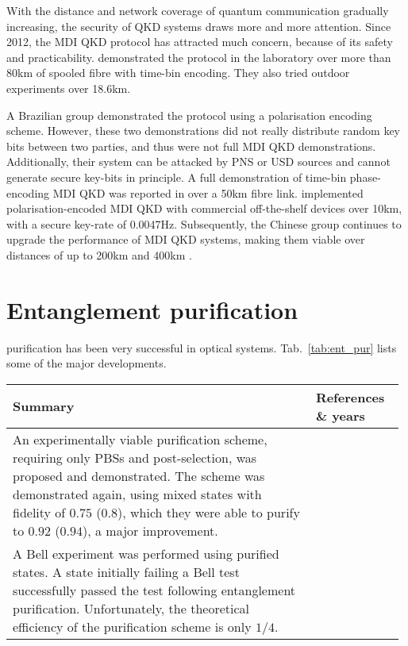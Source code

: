 With the distance and network coverage of quantum communication gradually increasing, the security of QKD systems draws more and more attention. Since 2012, the MDI QKD protocol has attracted much concern, because of its safety and practicability. \cite{bib:PRL_111_130501} demonstrated the protocol in the laboratory over more than 80km of spooled fibre with time-bin encoding. They also tried outdoor experiments over 18.6km.

A Brazilian group \cite{bib:PRA_88_052303} demonstrated the protocol using a polarisation encoding scheme. However, these two demonstrations did not really distribute random key bits between two parties, and thus were not full MDI QKD demonstrations. Additionally, their system can be attacked by PNS or USD  sources and cannot generate secure key-bits in principle. A full demonstration of time-bin phase-encoding MDI QKD was reported in \cite{bib:PRL_111_130502} over a 50km fibre link. \cite{bib:PRL_112_190503} implemented polarisation-encoded MDI QKD with commercial off-the-shelf devices over 10km, with a secure key-rate of 0.0047Hz. Subsequently, the Chinese group continues to upgrade the performance of MDI QKD systems, making them viable over distances of up to 200km \cite{bib:PRL_113_190501} and 400km \cite{bib:arx160606821}.

%
%

\section{Entanglement purification} 


 purification has been very successful in optical systems. Tab.~\ref{tab:ent_pur} lists some of the major developments.

\begin{table*}[!htbp]
\begin{tabular}{|p{0.755\linewidth}|p{0.22\linewidth}|}
	\hline
	Summary & References \& years \\
	\hline \hline
	An experimentally viable purification scheme, requiring only PBSs and post-selection, was proposed and demonstrated. The scheme was demonstrated again, using mixed states with fidelity of $0.75$ ($0.8$), which they were able to purify to $0.92$ ($0.94$), a major improvement. & \cite{bib:Pan01, bib:Pan03} \\
	\hline
	A Bell experiment was performed using purified states. A state initially failing a Bell test successfully passed the test following entanglement purification. Unfortunately, the theoretical efficiency of the purification scheme is only $1/4$. & \cite{bib:PRL_94_040504, bib:Pan01} \\
	\hline
\end{tabular}
\captionspacetab \caption{Developments in experimental entanglement purification.} \label{tab:ent_pur}
\end{table*}

